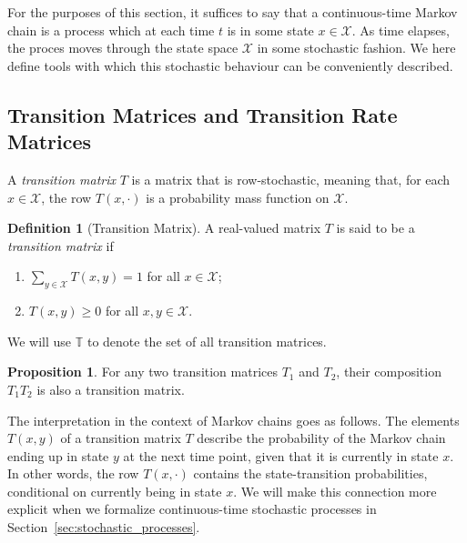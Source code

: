 \documentclass[10pt,a4paper]{paper}
\theoremstyle{definition}
\newtheorem{proposition}[theorem]{Proposition}
\newtheorem{definition}{Definition}
\newcommand{\states}{\mathcal{X}}
\begin{document}
For the purposes of this section, it suffices to say that a continuous-time Markov chain is a process which at each time $t$ is in some state $x\in\states$. As time elapses, the proces moves through the state space $\states$ in some stochastic fashion. We here define tools with which this stochastic behaviour can be conveniently described.

\subsection{Transition Matrices and Transition Rate Matrices}\label{sec:trans_rate_matrices}

A \emph{transition matrix} $T$ is a matrix that is row-stochastic, meaning that, for each $x\in\states$, the row $T(x,\cdot)$ is a probability mass function on $\states$.
\begin{definition}[Transition Matrix]\label{def:stoch_matrix}
A real-valued matrix $T$ is said to be a \emph{transition matrix} if
\vspace{5pt}
\begin{enumerate}[label=T\arabic*:,ref=T\arabic*]
\item\label{def:T:sumone}
$\sum_{y\in\states}T(x,y)=1$ for all $x\in\states$;\label{def:trans_matrix_is_stochastic}
\item\label{def:T:nonneg}
$T(x,y)\geq0$ for all $x,y\in\states$.
\end{enumerate}
\vspace{5pt}
\noindent We will use $\mathbb{T}$ to denote the set of all transition matrices.
\end{definition}

\begin{proposition}\label{lemma:compositiontransitionmatrix}
For any two transition matrices $T_1$ and $T_2$, their composition $T_1T_2$ is also a transition matrix.
\end{proposition}

The interpretation in the context of Markov chains goes as follows. The elements $T(x,y)$ of a transition matrix $T$ describe the probability of the Markov chain ending up in state $y$ at the next time point, given that it is currently in state $x$. In other words, the row $T(x,\cdot)$ contains the state-transition probabilities, conditional on currently being in state $x$. We will make this connection more explicit when we formalize continuous-time stochastic processes in Section~\ref{sec:stochastic_processes}.
\end{document}
